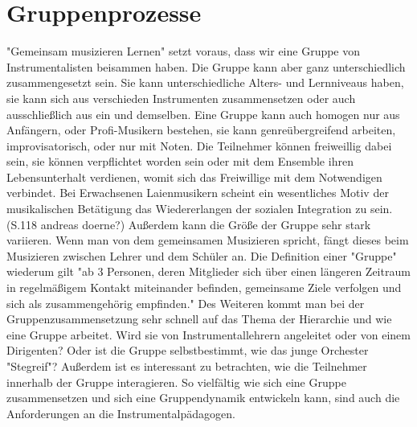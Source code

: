 \section{Gruppenprozesse}
"Gemeinsam musizieren Lernen" setzt voraus, dass wir eine Gruppe von
Instrumentalisten beisammen haben. Die Gruppe kann aber ganz unterschiedlich
zusammengesetzt sein. Sie kann unterschiedliche Alters- und Lernniveaus haben,
sie kann sich aus verschieden Instrumenten zusammensetzen oder auch
ausschließlich aus ein und demselben. Eine Gruppe kann auch homogen nur aus
Anfängern, oder Profi-Musikern bestehen, sie kann genreübergreifend arbeiten,
improvisatorisch, oder nur mit Noten. Die Teilnehmer können freiweillig dabei
sein, sie können verpflichtet worden sein oder mit dem Ensemble ihren
Lebensunterhalt verdienen, womit sich das Freiwillige mit dem Notwendigen
verbindet. 
Bei Erwachsenen Laienmusikern scheint ein
wesentliches Motiv der musikalischen Betätigung das Wiedererlangen der sozialen
Integration zu sein. (S.118 andreas doerne?) Außerdem kann die Größe der Gruppe sehr stark
variieren. Wenn man von dem gemeinsamen Musizieren spricht, fängt dieses beim
Musizieren zwischen Lehrer und dem Schüler an. Die Definition einer "Gruppe"
wiederum gilt "ab 3 Personen, deren Mitglieder sich über einen längeren Zeitraum
in regelmäßigem Kontakt miteinander befinden, gemeinsame Ziele verfolgen und
sich als zusammengehörig empfinden."
\autocite{wikipedia:gruppe}
Des Weiteren kommt man bei der Gruppenzusammensetzung sehr schnell auf das Thema der
Hierarchie und wie eine Gruppe arbeitet. Wird sie von Instrumentallehrern
angeleitet oder von einem Dirigenten? Oder ist die Gruppe selbstbestimmt, wie das
junge Orchester "Stegreif"? Außerdem ist es interessant zu betrachten, wie die
Teilnehmer innerhalb der Gruppe interagieren.
So vielfältig wie sich eine Gruppe zusammensetzen und sich eine Gruppendynamik
entwickeln kann, sind auch die Anforderungen an die Instrumentalpädagogen.


